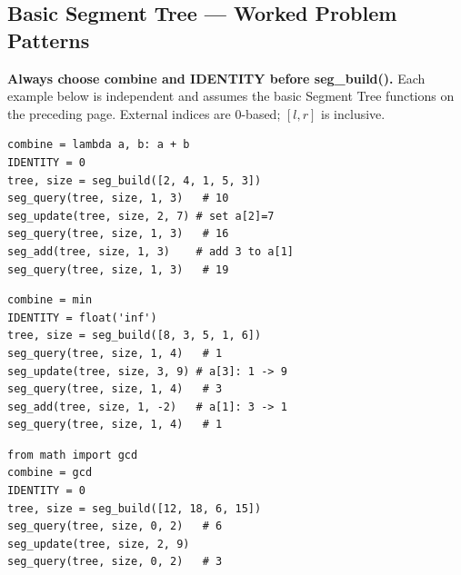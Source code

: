 \documentclass[9pt,a4paper]{extarticle}
\begin{document}
\subsection{Basic Segment Tree — Worked Problem Patterns}
{\small\textbf{Always choose combine and IDENTITY before seg\_build().}
 Each example below is independent and assumes the basic Segment Tree functions
 on the preceding page. External indices are 0-based; $[l,r]$ is inclusive.}\par\vspace{5pt}
\noindent
\begin{minipage}[t]{0.493\textwidth}\vspace{0pt}
\begin{lstlisting}
combine = lambda a, b: a + b
IDENTITY = 0
tree, size = seg_build([2, 4, 1, 5, 3])
seg_query(tree, size, 1, 3)   # 10
seg_update(tree, size, 2, 7) # set a[2]=7
seg_query(tree, size, 1, 3)   # 16
seg_add(tree, size, 1, 3)    # add 3 to a[1]
seg_query(tree, size, 1, 3)   # 19
\end{lstlisting}

\begin{lstlisting}
combine = min
IDENTITY = float('inf')
tree, size = seg_build([8, 3, 5, 1, 6])
seg_query(tree, size, 1, 4)   # 1
seg_update(tree, size, 3, 9) # a[3]: 1 -> 9
seg_query(tree, size, 1, 4)   # 3
seg_add(tree, size, 1, -2)   # a[1]: 3 -> 1
seg_query(tree, size, 1, 4)   # 1
\end{lstlisting}

\begin{lstlisting}
from math import gcd
combine = gcd
IDENTITY = 0
tree, size = seg_build([12, 18, 6, 15])
seg_query(tree, size, 0, 2)   # 6
seg_update(tree, size, 2, 9)
seg_query(tree, size, 0, 2)   # 3
\end{lstlisting}
\end{minipage}%
\end{document}
